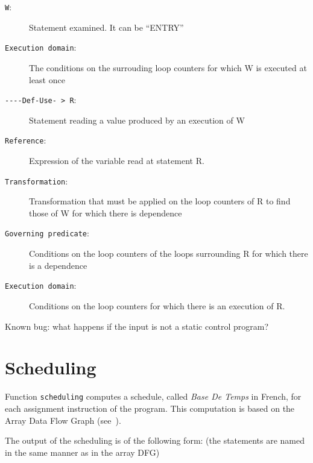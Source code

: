 \documentclass[a4paper]{report}
\newenvironment{PipsMake}{\begin{alltt}}{\end{alltt}}
\begin{document}
\begin{description}
\item[\texttt{W}:] Statement examined. It can be ``ENTRY''
\item[\texttt{Execution domain}:] The conditions on the surrouding loop
  counters for which W is executed at least once
\item[\texttt{-{}-{}-{}-Def-Use- > R}:] Statement reading a value produced by
  an execution of W
\item[\texttt{Reference}:] Expression of the variable read at statement
  R.
\item[\texttt{Transformation}:] Transformation that must be applied on
  the loop counters of R to find those of W for which there is dependence
\item[\texttt{Governing predicate}:] Conditions on the loop counters of
  the loops surrounding R for which there is a dependence
\item[\texttt{Execution domain}:] Conditions on the loop counters for
  which there is an execution of R.
\end{description}
Known bug: what happens if the input is not a static control program?







\section{Scheduling}
\label{subsection-scheduling}

Function \texttt{scheduling} computes a schedule, called {\em Base De
Temps} in French, for each assignment instruction of the program. This
computation is based on the Array Data Flow Graph (see~\cite{Fea92a,Fea92b}).

The output of the scheduling is of the following form:
(the statements are named in the same manner as in the array DFG)
\end{document}

